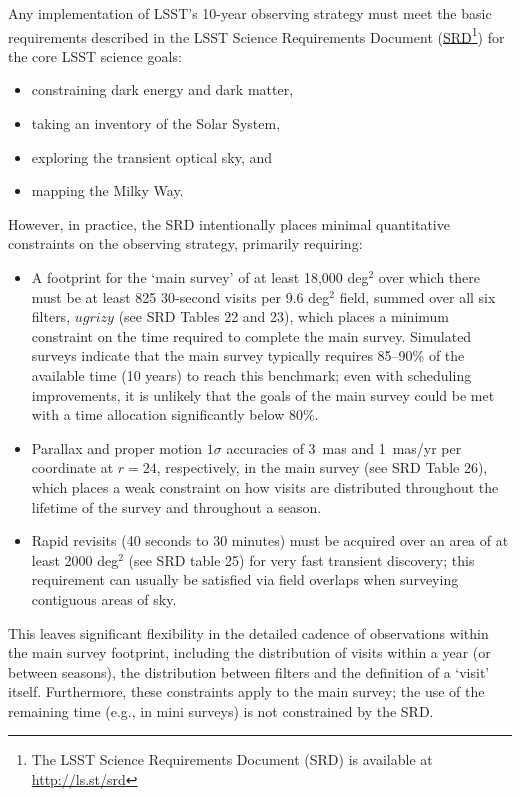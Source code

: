 \documentclass[DM,lsstdraft,toc,usenatbib]{lsstdoc}
\begin{document}
Any implementation of LSST's 10-year observing strategy must meet the basic requirements described in the 
LSST Science Requirements Document (\href{http://ls.st/srd}{SRD}\footnote{The LSST Science 
Requirements Document (SRD) is available at \href{http://ls.st/srd}{http://ls.st/srd}})
for the core LSST science goals:
\begin{itemize}
\item constraining dark energy and dark matter,
\item taking an inventory of the Solar System,
\item exploring the transient optical sky, and
\item mapping the Milky Way.
\end{itemize}
However, in practice, the SRD intentionally places minimal quantitative constraints on the observing strategy,
primarily requiring:
\begin{itemize} 
\item A footprint for the `main survey' of at least 18,000 deg$^2$ over which there must be
at least 825 30-second visits per 9.6 deg$^2$ field, summed over all six filters, $ugrizy$ (see SRD 
Tables 22 and 23), which places a minimum constraint on the time required to complete 
the main survey. Simulated surveys indicate that the main survey typically requires 85--90\% 
of the available time (10 years) to reach this benchmark; even with scheduling improvements, it is unlikely 
that the goals of the main survey could be met with a time allocation significantly below 80\%. 
\item Parallax and proper motion $1\sigma$ accuracies of 3~mas and 1~mas/yr per coordinate at $r=24$, 
respectively, in the main survey (see SRD Table 26), which places
a weak constraint on how visits are distributed throughout the lifetime of the survey and throughout a season.
\item Rapid revisits (40 seconds to 30 minutes) must be acquired over an area of at least 2000 deg$^2$ (see SRD table 25) for
very fast transient discovery; this requirement can usually be satisfied via field overlaps when surveying contiguous areas of sky. 
\end{itemize}
This leaves significant flexibility in the detailed cadence of observations within
the main survey footprint, including the distribution of visits within a year (or between seasons), the distribution between filters and 
the definition of a `visit' itself. Furthermore, these constraints apply to the main survey; the use of the 
remaining time (e.g., in mini surveys) is not constrained by the SRD.
\end{document}
